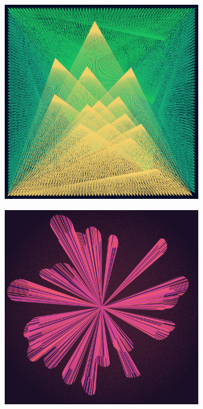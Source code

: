 \documentclass[11pt,twoside]{book}
\begin{document}
\begin{figure}[!ht]
\includegraphics[width=246pt]{oz-877d6762-fde1-41dc-bc1f-7dfa7e64e796.png}
\end{figure}
\newpage
{}
\fancyfoot[CE,CO]{\fontsize{10}{12}\selectfont \thepage}
\begin{figure}[!ht]
\includegraphics[width=246pt]{hot-dusk-3d713ec5-55fd-4d07-bb69-80d4d42a7879.png}
\end{figure}
\newpage
{}
\fancyfoot[CE,CO]{\fontsize{10}{12}\selectfont \thepage}
\end{document}
